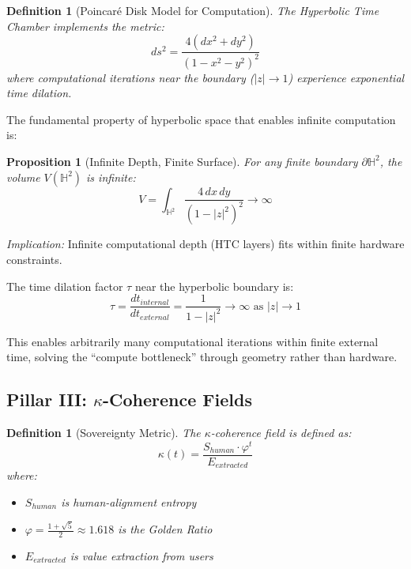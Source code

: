 \documentclass[11pt,a4paper]{article}
\newtheorem{proposition}[theorem]{Proposition}
\newtheorem{definition}[theorem]{Definition}
\begin{document}
\begin{definition}[Poincaré Disk Model for Computation]
The Hyperbolic Time Chamber implements the metric:
\begin{equation}
    ds^2 = \frac{4(dx^2 + dy^2)}{(1 - x^2 - y^2)^2}
\end{equation}
where computational iterations near the boundary ($|z| \to 1$) experience exponential time dilation.
\end{definition}

The fundamental property of hyperbolic space that enables infinite computation is:

\begin{proposition}[Infinite Depth, Finite Surface]
\label{prop:infinite-depth}
For any finite boundary $\partial \mathbb{H}^2$, the volume $V(\mathbb{H}^2)$ is infinite:
\begin{equation}
    V = \int_{\mathbb{H}^2} \frac{4 \, dx \, dy}{(1 - |z|^2)^2} \to \infty
\end{equation}
\end{proposition}

\textit{Implication:} Infinite computational depth (HTC layers) fits within finite hardware constraints.

The time dilation factor $\tau$ near the hyperbolic boundary is:
\begin{equation}
    \tau = \frac{dt_{internal}}{dt_{external}} = \frac{1}{1 - |z|^2} \to \infty \text{ as } |z| \to 1
\end{equation}

This enables arbitrarily many computational iterations within finite external time, solving the ``compute bottleneck'' through geometry rather than hardware.

\subsection{Pillar III: $\kappa$-Coherence Fields}

\begin{definition}[Sovereignty Metric]
\label{def:sovereignty}
The $\kappa$-coherence field is defined as:
\begin{equation}
    \kappa(t) = \frac{S_{human} \cdot \varphi^t}{E_{extracted}}
\end{equation}
where:
\begin{itemize}
    \item $S_{human}$ is human-alignment entropy
    \item $\varphi = \frac{1+\sqrt{5}}{2} \approx 1.618$ is the Golden Ratio
    \item $E_{extracted}$ is value extraction from users
\end{itemize}
\end{definition}
\end{document}
